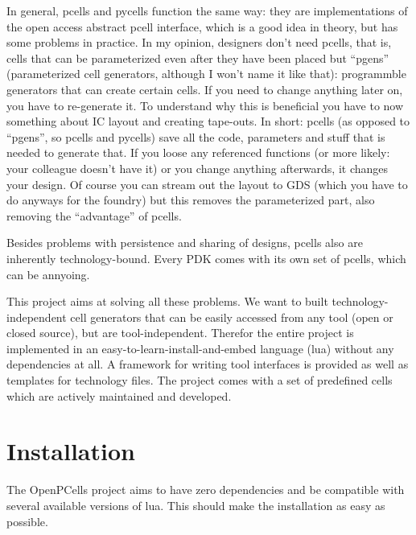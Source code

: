 In general, pcells and pycells function the same way: they are implementations of the open access abstract pcell interface, which is a good idea in theory, but has
some problems in practice. In my opinion, designers don't need pcells, that is, cells that can be parameterized even after they have been placed but \enquote{pgens}
(parameterized cell generators, although I won't name it like that): programmble generators that can create certain cells. If you need to change anything later on,
you have to re-generate it. To understand why this is beneficial you have to now something about IC layout and creating tape-outs. In short: pcells (as opposed to
\enquote{pgens}, so pcells and pycells) save all the code, parameters and stuff that is needed to generate that. If you loose any referenced functions (or more
likely: your colleague doesn't have it) or you change anything afterwards, it changes your design. Of course you can stream out the layout to GDS (which you have to
do anyways for the foundry) but this removes the parameterized part, also removing the \enquote{advantage} of pcells.

Besides problems with persistence and sharing of designs, pcells also are inherently technology-bound. Every PDK comes with its own set of pcells, which can be
annyoing.

This project aims at solving all these problems. We want to built technology-independent cell generators that can be easily accessed from any tool (open or closed
source), but are tool-independent. Therefor the entire project is implemented in an easy-to-learn-install-and-embed language (lua) without any dependencies at all. A
framework for writing tool interfaces is provided as well as templates for technology files. The project comes with a set of predefined cells which are actively
maintained and developed.

\section{Installation}
The OpenPCells project aims to have zero dependencies and be compatible with several available versions of lua. This should make the installation as easy as
possible.



